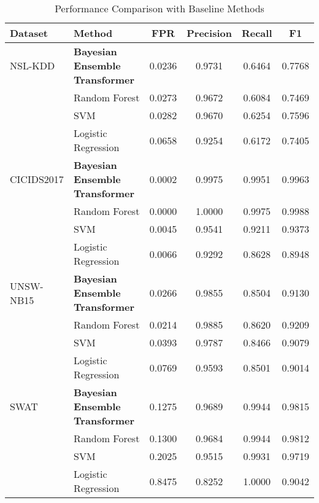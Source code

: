 \begin{table*}[h]
\centering
\caption{Performance Comparison with Baseline Methods}
\label{tab:baseline_comparison}
\begin{tabular}{llcccc}
\hline
Dataset & Method & FPR & Precision & Recall & F1 \\
\hline
NSL-KDD & \textbf{Bayesian Ensemble Transformer} & 0.0236 & 0.9731 & 0.6464 & 0.7768 \\
 & Random Forest & 0.0273 & 0.9672 & 0.6084 & 0.7469 \\
 & SVM & 0.0282 & 0.9670 & 0.6254 & 0.7596 \\
 & Logistic Regression & 0.0658 & 0.9254 & 0.6172 & 0.7405 \\
\hline
CICIDS2017 & \textbf{Bayesian Ensemble Transformer} & 0.0002 & 0.9975 & 0.9951 & 0.9963 \\
 & Random Forest & 0.0000 & 1.0000 & 0.9975 & 0.9988 \\
 & SVM & 0.0045 & 0.9541 & 0.9211 & 0.9373 \\
 & Logistic Regression & 0.0066 & 0.9292 & 0.8628 & 0.8948 \\
\hline
UNSW-NB15 & \textbf{Bayesian Ensemble Transformer} & 0.0266 & 0.9855 & 0.8504 & 0.9130 \\
 & Random Forest & 0.0214 & 0.9885 & 0.8620 & 0.9209 \\
 & SVM & 0.0393 & 0.9787 & 0.8466 & 0.9079 \\
 & Logistic Regression & 0.0769 & 0.9593 & 0.8501 & 0.9014 \\
\hline
SWAT & \textbf{Bayesian Ensemble Transformer} & 0.1275 & 0.9689 & 0.9944 & 0.9815 \\
 & Random Forest & 0.1300 & 0.9684 & 0.9944 & 0.9812 \\
 & SVM & 0.2025 & 0.9515 & 0.9931 & 0.9719 \\
 & Logistic Regression & 0.8475 & 0.8252 & 1.0000 & 0.9042 \\
\hline
\end{tabular}
\end{table*}
